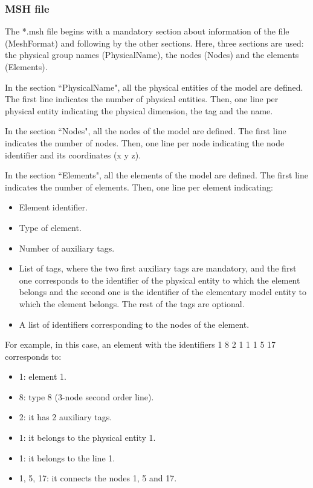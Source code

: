\documentclass[a4]{article}
\begin{document}
\subsubsection{MSH file}

The *.msh file begins with a mandatory section about information of the file (MeshFormat) and following by the other sections. Here, three sections are used: the physical group names (PhysicalName), the nodes (Nodes) and the elements (Elements).

In the section ``PhysicalName", all the physical entities of the model are defined. The first line indicates the number of physical entities. Then, one line per physical entity indicating the physical dimension, the tag and the name.  

In the section ``Nodes", all the nodes of the model are defined. The first line indicates the number of nodes. Then, one line per node indicating the node identifier and its coordinates (x y z).

In the section ``Elements", all the elements of the model are defined. The first line indicates the number of elements. Then, one line per element indicating:

\begin{itemize}
	\item Element identifier.
	\item Type of element.
	\item Number of auxiliary tags.
	\item List of tags, where the two first auxiliary tags are mandatory, and the first one corresponds to the identifier of the physical entity to which the element belongs and the second one is the identifier of the elementary model entity to which the element belongs. The rest of the tags are optional.
	\item A list of identifiers corresponding to the nodes of the element.
\end{itemize}

For example, in this case, an element with the identifiers 1 8 2 1 1 1 5 17 corresponds to:

\begin{itemize}
	\item 1: element 1.
	\item 8: type 8 (3-node second order line).
	\item 2: it has 2 auxiliary tags.
	\item 1: it belongs to the physical entity 1.
	\item 1: it belongs to the line 1.
	\item 1, 5, 17: it connects the nodes 1, 5 and 17.
\end{itemize} 
\end{document}
